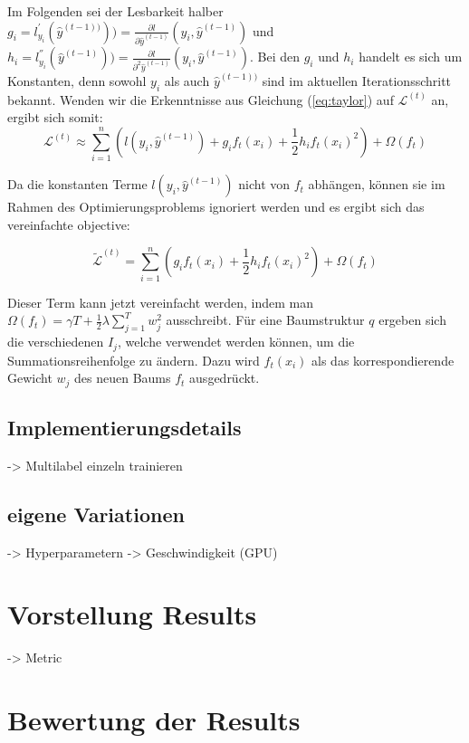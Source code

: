 \documentclass[a4paper,12pt]{scrartcl}
\newcommand{\LL}{\ensuremath{\mathcal{L}}}
\begin{document}
Im Folgenden sei der Lesbarkeit halber $g_i = l_{y_i}^{'}(\hat{y}^{(t-1))}) ) = \frac{\partial l}{\partial \hat{y}^{(t-1)}}(y_i,\hat{y}^{(t-1)})$ und $h_i = l_{y_i}^{''}(\hat{y}^{(t-1)}) ) = \frac{\partial l}{\partial^2 \hat{y}^{(t-1)}}(y_i,\hat{y}^{(t-1)})$. Bei den $g_i$ und $h_i$ handelt es sich um Konstanten, denn sowohl $y_i$ als auch $\hat{y}^{(t-1))}$ sind im aktuellen Iterationsschritt bekannt. Wenden wir die Erkenntnisse aus Gleichung (\ref{eq:taylor}) auf $\LL^{(t)}$ an, ergibt sich somit:
\begin{equation}
	 \LL^{(t)} \approx \sum_{i=1}^{n} (l(y_i,\hat{y}^{(t-1)}) + g_if_t(x_i) + \frac{1}{2} h_i f_t(x_i)^2) + \Omega(f_t)
\end{equation}

Da die konstanten Terme $l(y_i,\hat{y}^{(t-1)})$ nicht von $f_t$ abhängen, können sie im Rahmen des Optimierungsproblems ignoriert werden und es ergibt sich das vereinfachte objective:

\begin{equation}
\tilde{\LL}^{(t)} = \sum_{i=1}^{n}( g_if_t(x_i) + \frac{1}{2} h_i f_t(x_i)^2) + \Omega(f_t)
\end{equation}

Dieser Term kann jetzt vereinfacht werden, indem man $\Omega(f_t) = \gamma T + \frac{1}{2}\lambda \sum_{j=1}^{T} w_j^2$ ausschreibt. Für eine Baumstruktur $q$ ergeben sich die verschiedenen $I_j$, welche verwendet werden können, um die Summationsreihenfolge zu ändern. Dazu wird $f_t(x_i)$ als das korrespondierende Gewicht $w_j$ des neuen Baums $f_t$ ausgedrückt.


\subsection{Implementierungsdetails}
-> Multilabel einzeln trainieren

\subsection{eigene Variationen}
-> Hyperparametern
-> Geschwindigkeit (GPU)


\section{Vorstellung Results}
-> Metric

\section{Bewertung der Results}
\end{document}
